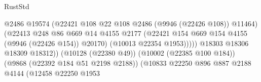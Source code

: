 \begin{lexlean}{RustStd}
\begin{coremodule}
                                                          @2486
                                                          @19574
                                                          (@22421
                                                            @108
                                                            @22
                                                            @108
                                                            @2486
                                                            (@9946 (@22426 @108))
                                                            @11464)
                                                          (@22413
                                                            @248
                                                            @86
                                                            @669
                                                            @14
                                                            @4155
                                                            @2177
                                                            (@22421
                                                              @154
                                                              @669
                                                              @154
                                                              @4155
                                                              (@9946 (@22426 @154))
                                                              @20170)
                                                            (@10013 @22354 @1953)))))
                                                    @18303
                                                    @18306
                                                    @18309
                                                    @18312))
                                                (@10128 (@22380 @49))
                                                (@10002 (@22385 @100 @184))
                                                (@9868 (@22392 @184 @51 @2198 @2188))
                                                (@10833
                                                  @22250
                                                  @896
                                                  @887
                                                  @2188
                                                  @4144
                                                  (@12458
                                                    @22250
                                                    @1953

\end{coremodule}
\end{lexlean}
